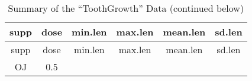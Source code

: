 \documentclass[]{article}
\begin{document}
\begin{longtable}[c]{@{}cccccc@{}}
\caption{Summary of the ``ToothGrowth'' Data (continued
below)}\tabularnewline
\toprule
\begin{minipage}[b]{0.08\columnwidth}\centering\strut
supp
\strut\end{minipage} &
\begin{minipage}[b]{0.08\columnwidth}\centering\strut
dose
\strut\end{minipage} &
\begin{minipage}[b]{0.12\columnwidth}\centering\strut
min.len
\strut\end{minipage} &
\begin{minipage}[b]{0.12\columnwidth}\centering\strut
max.len
\strut\end{minipage} &
\begin{minipage}[b]{0.13\columnwidth}\centering\strut
mean.len
\strut\end{minipage} &
\begin{minipage}[b]{0.09\columnwidth}\centering\strut
sd.len
\strut\end{minipage}\tabularnewline
\midrule
\endfirsthead
\toprule
\begin{minipage}[b]{0.08\columnwidth}\centering\strut
supp
\strut\end{minipage} &
\begin{minipage}[b]{0.08\columnwidth}\centering\strut
dose
\strut\end{minipage} &
\begin{minipage}[b]{0.12\columnwidth}\centering\strut
min.len
\strut\end{minipage} &
\begin{minipage}[b]{0.12\columnwidth}\centering\strut
max.len
\strut\end{minipage} &
\begin{minipage}[b]{0.13\columnwidth}\centering\strut
mean.len
\strut\end{minipage} &
\begin{minipage}[b]{0.09\columnwidth}\centering\strut
sd.len
\strut\end{minipage}\tabularnewline
\midrule
\endhead
\begin{minipage}[t]{0.08\columnwidth}\centering\strut
OJ
\strut\end{minipage} &
\begin{minipage}[t]{0.08\columnwidth}\centering\strut
0.5
\strut\end{minipage} &
\begin{minipage}[t]{0.12\columnwidth}\centering\strut

\end{minipage}
\end{longtable}
\end{document}
